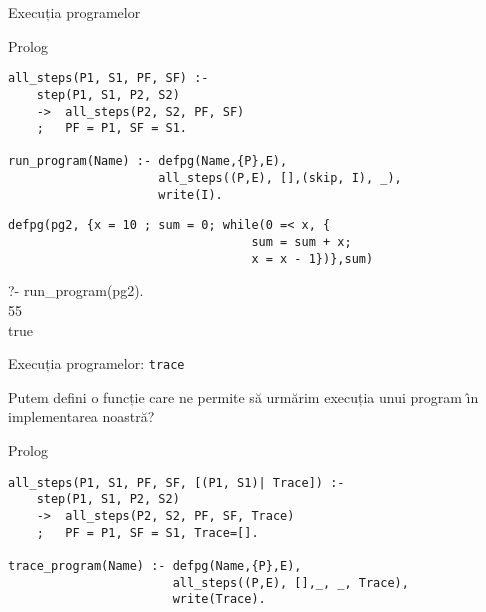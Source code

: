 \documentclass[xcolor=x11names,compress,10pt]{beamer}
\begin{document}
  
 \begin{frame}[fragile]{Execuția programelor}
 
 \begin{block}{Prolog}  
  \begin{verbatim}
all_steps(P1, S1, PF, SF) :-
    step(P1, S1, P2, S2)
    ->  all_steps(P2, S2, PF, SF)
    ;   PF = P1, SF = S1.
                     
run_program(Name) :- defpg(Name,{P},E),
                     all_steps((P,E), [],(skip, I), _),
                     write(I).
  \end{verbatim}
  \vspace*{-0.5cm}
  \end{block}
    \vspace*{-0.5cm}
     \begin{example}  
  \begin{verbatim}
defpg(pg2, {x = 10 ; sum = 0; while(0 =< x, {
                                  sum = sum + x;
                                  x = x - 1})},sum)
\end{verbatim}

?- run\_program(pg2).\\
55\\
true
  \end{example}
  \vspace*{0.3cm}
  \end{frame}  
  
    

 \begin{frame}[fragile]{Execuția programelor: \texttt{trace}}
 
 \medskip
 
 Putem defini o funcție care ne permite să urmărim execuția unui program \^{\i}n implementarea noastră?
 
 \medskip\pause
 
 \begin{block}{Prolog}
 
 \begin{verbatim}
all_steps(P1, S1, PF, SF, [(P1, S1)| Trace]) :-
    step(P1, S1, P2, S2)
    ->  all_steps(P2, S2, PF, SF, Trace)
    ;   PF = P1, SF = S1, Trace=[].

trace_program(Name) :- defpg(Name,{P},E), 
                       all_steps((P,E), [],_, _, Trace),
                       write(Trace).
\end{verbatim}
\end{block}
\end{frame}
\end{document}
